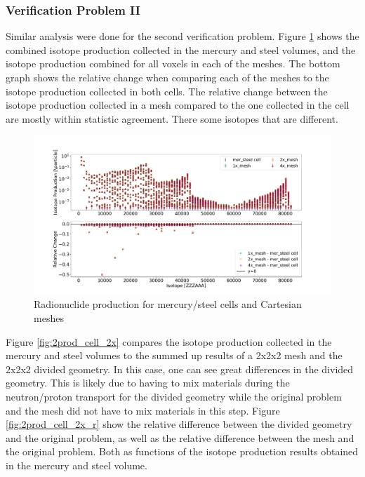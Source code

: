 
\newpage

\subsubsection{Verification Problem II}
Similar analysis were done for the second verification problem. Figure
\ref{fig:2prod_cell_1x_2x_4x} shows the combined isotope production collected
in the mercury and steel volumes, and the isotope production combined for all
voxels in each of the meshes. The bottom graph shows the relative change when
comparing each of the meshes to the isotope production collected in both cells.
The relative change between the isotope production collected in a mesh compared
to the one collected in the cell are mostly within statistic agreement. There
some isotopes that are different.
%
\begin{figure}[H]
 \centering
 \includegraphics[scale=0.4,trim={2cm 1cm 3cm 2cm},clip]{../figs/toy_p2/prod_VPII_1x_2x_4x.pdf}
 \caption{Radionuclide production for mercury/steel cells and Cartesian meshes}
 \label{fig:2prod_cell_1x_2x_4x}
\end{figure}
%
Figure \ref{fig:2prod_cell_2x} compares the isotope production collected in the
mercury and steel volumes to the summed up results of a 2x2x2 mesh and the 2x2x2
divided geometry. In this case, one can see great differences in the divided
geometry. This is likely due to having to mix materials during the
neutron/proton transport for the divided geometry while the original problem
and the mesh did not have to mix materials in this step.
Figure \ref{fig:2prod_cell_2x_r} show the relative difference between the
divided geometry and the original problem, as well as the relative difference
between the mesh and the original problem. Both as functions of the isotope
production results obtained in the mercury and steel volume.
